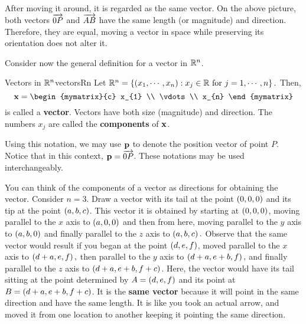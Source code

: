After moving it around, it is regarded as the same vector. On the above picture, both vectors $\overrightarrow{0P}$ and $\overrightarrow{AB}$ have the same length (or magnitude) and direction. Therefore, they are equal, moving a vector in space while preserving its orientation does not alter it.

Consider now the general definition for a vector in $\mathbb{R}^n$. 

\begin{definition}{Vectors in $\mathbb{R}^n$}{vectorsRn}
Let $\mathbb{R}^{n} = \left\{\left(x_{1}, \cdots, x_{n}\right)
:x_{j}\in \mathbb{R}\mbox{ for }j=1,\cdots ,n\right\} .$
Then,
\begin{equation*}
\vect{x}
=
\begin{mymatrix}{c}
x_{1} \\
\vdots \\
x_{n}
\end{mymatrix} 
\end{equation*}
is called a \textbf{vector}. Vectors have both size (magnitude) and direction. 
The numbers $x_{j}$ are called the \textbf{components} of ${\bf x}$. 

\end{definition}

Using this notation, we may use ${\bf p}$ to denote the position vector of point $P$. Notice that in this context, ${\bf p} = \overrightarrow{0P}$. These notations may be used interchangeably. 

You can think of the components of a vector as directions for
obtaining the vector. Consider $n=3$.  Draw a vector with its tail at
the point $\left(0,0,0\right) $ and its tip at the point $\left(
a,b,c\right) $. This vector it is obtained by starting at $\left(
0,0,0\right) $, moving parallel to the $x$ axis to $\left(
a,0,0\right) $ and then from here, moving parallel to the $y$ axis to
$\left(a,b,0\right) $ and finally parallel to the $z$ axis to $\left(
a,b,c\right). $ Observe that the same vector would result if you began
at the point $ \left(d,e,f \right)$, moved parallel to the $x$ axis
to $\left(d+a,e,f\right) ,$ then parallel to the $y$ axis to $\left(
d+a,e+b,f\right) ,$ and finally parallel to the $z$ axis to $\left(
d+a,e+b,f+c\right)$. Here, the vector would have its tail sitting at
the point determined by $A= \left(d,e,f\right) $ and its point at
$B=\left(d+a,e+b,f+c\right)$. It is the \textbf{same vector} because
it will point in the same direction and have the same length. It is
like you took an actual arrow, and moved it from one location to another keeping it pointing
the same direction.

